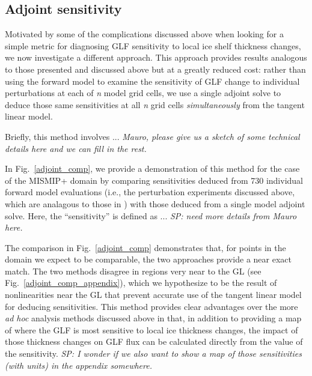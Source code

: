 \documentclass[review,oneside]{igs}
\begin{document}
\subsection{Adjoint sensitivity}

Motivated by some of the complications discussed above when looking for a simple metric for diagnosing GLF sensitivity to local ice shelf thickness changes, we now investigate a different approach. This approach provides results analogous to those presented and discussed above but at a greatly reduced cost: rather than using the forward model to examine the sensitivity of GLF change to individual perturbations at each of \textit{n} model grid cells, we use a single adjoint solve to deduce those same sensitivities at all \textit{n} grid cells \textit{simultaneously} from the tangent linear model. 

Briefly, this method involves ... 
\textit{Mauro, please give us a sketch of some technical details here and we can fill in the rest.}

In Fig.~\ref{adjoint_comp}, we provide a demonstration of this method for the case of the MISMIP+ domain by comparing sensitivities deduced from 730 individual forward model evaluations (i.e., the perturbation experiments discussed above, which are analagous to those in \citet{reese2018}) with those deduced from a single model adjoint solve. Here, the ``sensitivity'' is defined as ... \textit{SP: need more details from Mauro here.} 

The comparison in Fig.~\ref{adjoint_comp} demonstrates that, for points in the domain we expect to be comparable, the two approaches provide a near exact match. The two methods disagree in regions very near to the GL (see Fig.~\ref{adjoint_comp_appendix}), which we hypothesize to be the result of nonlinearities near the GL that prevent accurate use of the tangent linear model for deducing sensitivities. This method provides clear advantages over the more \textit{ad hoc} analysis methods discussed above in that, in addition to providing a map of where the GLF is most sensitive to local ice thickness changes, the impact of those thickness changes on GLF flux can be calculated directly from the value of the sensitivity. \textit{SP: I wonder if we also want to show a map of those sensitivities (with units) in the appendix somewhere.}  
\end{document}
